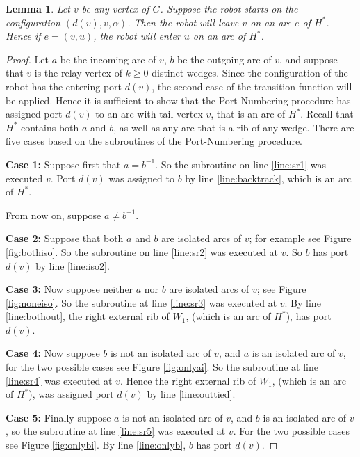 \documentclass[12pt,letterpaper,oneside]{book}
\newtheorem{lemma}[theorem]{Lemma}
\begin{document}
\begin{lemma}\label{lemmastart}
Let $v$ be any vertex of $G$.  Suppose the robot starts on the configuration $(d(v),v,\alpha)$.  
Then the robot will leave $v$ on an arc $e$ of $H^*$.  Hence if $e=(v,u)$, the robot will enter 
$u$ on an arc of $H^*$.
\end{lemma}
\begin{proof}  

Let $a$ be the incoming arc of $v$, $b$ be the 
outgoing arc of $v$, and suppose that $v$ is the relay vertex of $k\ge 0$ distinct wedges.  
Since the configuration of the robot has the entering port $d(v)$, the second case of the transition function will be applied.  Hence it is sufficient 
to show that the Port-Numbering procedure has assigned port $d(v)$ to an arc with tail vertex $v$, that is an arc of $H^*$.  
Recall that $H^*$ contains both $a$ and $b$, as well as 
any arc that is a rib of any wedge.  
There are five cases based on the subroutines of the Port-Numbering procedure. 



\noindent\textbf{Case 1: } Suppose first that $a=b^{-1}$.    
So the subroutine on line \ref{line:sr1} 
was executed $v$.  Port $d(v)$ was assigned to $b$ by line 
\ref{line:backtrack}, which is an arc of $H^*$.  

From now on, suppose $a\ne b^{-1}$.

\noindent\textbf{Case 2: } Suppose that both $a$ and $b$ are isolated arcs of $v$; for example 
see Figure \ref{fig:bothiso}.  
So the subroutine on line \ref{line:sr2} was executed at $v$.  So 
$b$ has port $d(v)$ by line \ref{line:iso2}.  


\noindent\textbf{Case 3: } Now suppose neither $a$ nor $b$ are isolated arcs of $v$; 
see Figure \ref{fig:noneiso}.  So the subroutine at line \ref{line:sr3} was executed at $v$.    
By line \ref{line:bothout}, the right external rib of $W_1$, (which is an arc of $H^*$), has port $d(v)$.  
 

\noindent\textbf{Case 4: } Now suppose $b$ is not an isolated arc of $v$, and $a$ is an isolated arc of $v$, for 
the two possible cases see Figure \ref{fig:onlyai}.  
So the subroutine at line \ref{line:sr4} was executed at $v$.    
Hence the right external rib of $W_1$, (which is an arc of $H^*$), was assigned port $d(v)$ by line \ref{line:outtied}.  


\noindent\textbf{Case 5: } Finally suppose $a$ is not an isolated arc of $v$, and $b$ is an isolated arc of $v$, 
so the subroutine at line \ref{line:sr5} was executed at $v$.  For the two possible cases see Figure \ref{fig:onlybi}.
By line \ref{line:onlyb}, $b$ has port $d(v)$.

\end{proof}
\end{document}
